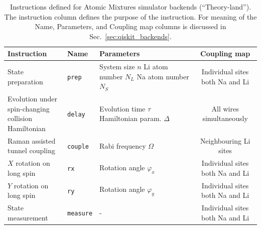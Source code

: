 \documentclass[a4paper, 10pt]{article}
\begin{document}
    
    \begin{table}[htbp]
        \centering
        \caption{Instructions defined for Atomic Mixtures simulator backends (``Theory-land''). The instruction column defines the purpose of the instruction. For meaning of the Name, Parameters, and Coupling map columns is discussed in Sec.~\ref{sec:qiskit_backends}.}
        \label{tab:instructions_mixtures_theory}
        \begin{tabular}{l l l c}
            Instruction & Name & Parameters & Coupling map \\ \hline\hline
            State preparation & \texttt{prep} & \makecell[l]{System size $n$ \\ Li atom number $N_L$ \\ Na atom number $N_S$} & \makecell{Individual sites \\ both Na and Li} \\ \hline
            \makecell[l]{Evolution under \\ spin-changing collision \\ Hamiltonian} & \texttt{delay} & \makecell[l]{Evolution time $\tau$ \\ Hamiltonian param. $\Delta$} & All wires simultaneously \\  \hline
            \makecell[l]{Raman assisted \\ tunnel coupling} & \texttt{couple} & Rabi frequency $\Omega$ & Neighbouring Li sites \\ \hline
            \makecell[l]{$X$ rotation \\ on long spin} & \texttt{rx} & Rotation angle $\varphi_x$ & \makecell{Individual sites \\ both Na and Li} \\ \hline
            \makecell[l]{$Y$ rotation \\ on long spin} & \texttt{ry} & Rotation angle $\varphi_y$ & \makecell{Individual sites \\ both Na and Li} \\ \hline
            State measurement & \texttt{measure} & - & \makecell{Individual sites \\ both Na and Li} \\ \hline

        \end{tabular}
    \end{table}
    
\end{document}
